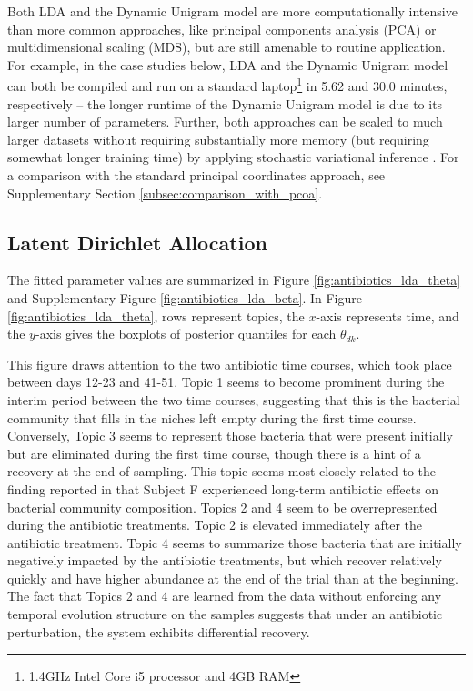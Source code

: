 \documentclass[oupdraft]{bio}
\begin{document}
Both LDA and the Dynamic Unigram model are more computationally intensive than
more common approaches, like principal components analysis (PCA) or
multidimensional scaling (MDS), but are still amenable to routine application.
For example, in the case studies below, LDA and the Dynamic Unigram model can
both be compiled and run on a standard laptop\footnote{1.4GHz Intel Core i5
  processor and 4GB RAM} in 5.62 and 30.0 minutes, respectively -- the longer
runtime of the Dynamic Unigram model is due to its larger number of parameters.
Further, both approaches can be scaled to much larger datasets without requiring
substantially more memory (but requiring somewhat longer training time) by
applying stochastic variational inference \citep{hoffman2013stochastic}. For a
comparison with the standard principal coordinates approach, see Supplementary
Section \ref{subsec:comparison_with_pcoa}.

\subsection{Latent Dirichlet Allocation}
\label{sec:antibiotics_lda}

The fitted parameter values are summarized in Figure
\ref{fig:antibiotics_lda_theta} and Supplementary Figure
\ref{fig:antibiotics_lda_beta}. In Figure \ref{fig:antibiotics_lda_theta}, rows
represent topics, the $x$-axis represents time, and the $y$-axis gives the
boxplots of posterior quantiles for each $\theta_{dk}$.

This figure draws attention to the two antibiotic time courses, which took place
between days 12-23 and 41-51. Topic 1 seems to become prominent during the
interim period between the two time courses, suggesting that this is the
bacterial community that fills in the niches left empty during the first time
course. Conversely, Topic 3 seems to represent those bacteria that were present
initially but are eliminated during the first time course, though there is a
hint of a recovery at the end of sampling. This topic seems most closely related
to the finding reported in \cite{dethlefsen2011incomplete} that Subject F
experienced long-term antibiotic effects on bacterial community composition.
Topics 2 and 4 seem to be overrepresented during the antibiotic treatments.
Topic 2 is elevated immediately after the antibiotic treatment. Topic 4 seems to
summarize those bacteria that are initially negatively impacted by the
antibiotic treatments, but which recover relatively quickly and have higher
abundance at the end of the trial than at the beginning. The fact that Topics 2
and 4 are learned from the data without enforcing any temporal evolution
structure on the samples suggests that under an antibiotic perturbation, the
system exhibits differential recovery.
\end{document}
